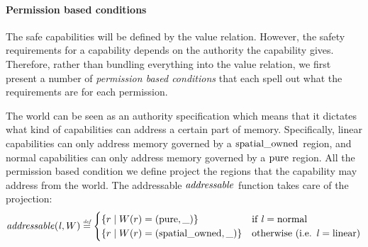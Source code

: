\begin{jversion}

\paragraph{Permission based conditions}
\label{par:perm-cond}
The safe capabilities will be defined by the value relation.
However, the safety requirements for a capability depends on the authority the capability gives.
Therefore, rather than bundling everything into the value relation, we first present a number of \emph{permission based conditions} that each spell out what the requirements are for each permission.

The world can be seen as an authority specification which means that it dictates what kind of capabilities can address a certain part of memory.
Specifically, linear capabilities can only address memory governed by a $\mathrm{spatial\_owned}$ region, and normal capabilities can only address memory governed by a $\mathrm{pure}$ region.
All the permission based condition we define project the regions that the capability may address from the world.
The addressable $\addressable{}$ function takes care of the projection:
\[
  \addressable{\lin,W} \defeq
  \begin{cases}
    \{ r \mid W(r) = (\pure,\_) \} & \text{if $\lin = \normal$} \\
    \{ r \mid W(r) = (\spatialo,\_) \}  & \text{otherwise (i.e. $\lin = \linear$)} \\
  \end{cases}
\]


\end{jversion}
